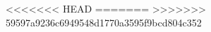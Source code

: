 \documentclass[12pt]{article}
\newcommand{\<}{{\langle \!\! \langle}}
\renewcommand{\>}{{\rangle \!\! \rangle}}
\newcommand{\commento}[1]{
	\par\noindent
	\colorbox{light}{\begin{minipage}{120 mm}#1\end{minipage}}
	\par\noindent
}
\begin{document}
<<<<<<< HEAD
=======
>>>>>>> 59597a9236c6949548d1770a3595f9bcd804c352


%
%
%
%
%
%
%
\end{document}
